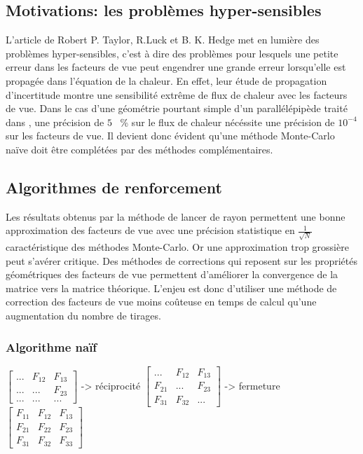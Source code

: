\subsection{Motivations: les problèmes hyper-sensibles}
L'article de Robert P. Taylor, R.Luck et B. K. Hedge \cite{hypersensitive} met en lumière des problèmes hyper-sensibles, c'est à dire des problèmes pour lesquels une petite erreur dans les facteurs de vue peut engendrer une grande erreur lorsqu'elle est propagée dans l'équation de la chaleur. En effet, leur étude de propagation d'incertitude montre une sensibilité extrême de flux de chaleur avec les facteurs de vue. Dans le cas d'une géométrie pourtant simple d'un parallélépipède traité dans \cite{incro}, une précision de $5$ ~\% sur le flux de chaleur nécéssite une précision de $10^{-4}$ sur les facteurs de vue.
Il devient donc évident qu'une méthode Monte-Carlo naïve doit être complétées par des méthodes complémentaires.

\subsection{Algorithmes de renforcement}
Les résultats obtenus par la méthode de lancer de rayon permettent une bonne approximation des facteurs de vue avec une précision statistique en $\frac{1}{\sqrt{N}}$ caractéristique des méthodes Monte-Carlo. Or une approximation trop grossière peut s'avérer critique. Des méthodes de corrections \cite{renforcement95} qui reposent sur les propriétés géométriques des facteurs de vue permettent d'améliorer la convergence de la matrice vers la matrice théorique. L'enjeu est donc d'utiliser une méthode de correction des facteurs de vue moins coûteuse en temps de calcul qu'une augmentation du nombre de tirages.
\subsubsection{Algorithme naïf}
     
$\begin{bmatrix}
                ... & F_{12} & F_{13}\\
                ... & ... & F_{23} \\
                ... & ... & ... 
        \end{bmatrix}$
        -> réciprocité
        $\begin{bmatrix}
                ... & F_{12} & F_{13}\\
                F_{21} & ... & F_{23} \\
                F_{31} & F_{32} & ... 
        \end{bmatrix}$
        -> fermeture
        $\begin{bmatrix}
                F_{11} & F_{12} & F_{13}\\
                F_{21} & F_{22} & F_{23} \\
                F_{31} & F_{32} & F_{33} 
        \end{bmatrix}$

